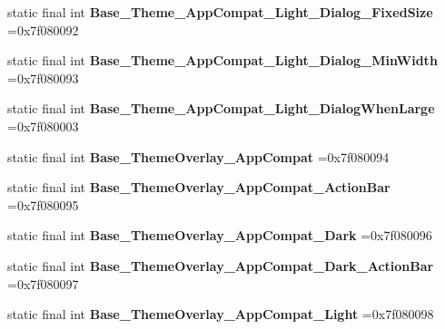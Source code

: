 \begin{DoxyCompactItemize}
\item 
\hypertarget{classcheck_1_1test_1_1_r_1_1style_a38aeff44175280c443f1693713c6e28d}{}static final int {\bfseries Base\+\_\+\+Theme\+\_\+\+App\+Compat\+\_\+\+Light\+\_\+\+Dialog\+\_\+\+Fixed\+Size} =0x7f080092\label{classcheck_1_1test_1_1_r_1_1style_a38aeff44175280c443f1693713c6e28d}

\item 
\hypertarget{classcheck_1_1test_1_1_r_1_1style_a411dd593cb514d32bf70653bcd704ce3}{}static final int {\bfseries Base\+\_\+\+Theme\+\_\+\+App\+Compat\+\_\+\+Light\+\_\+\+Dialog\+\_\+\+Min\+Width} =0x7f080093\label{classcheck_1_1test_1_1_r_1_1style_a411dd593cb514d32bf70653bcd704ce3}

\item 
\hypertarget{classcheck_1_1test_1_1_r_1_1style_aba284938b7549df2875454d58c2b9645}{}static final int {\bfseries Base\+\_\+\+Theme\+\_\+\+App\+Compat\+\_\+\+Light\+\_\+\+Dialog\+When\+Large} =0x7f080003\label{classcheck_1_1test_1_1_r_1_1style_aba284938b7549df2875454d58c2b9645}

\item 
\hypertarget{classcheck_1_1test_1_1_r_1_1style_a6604a7e1c8ba3257cc48d29bcad246a7}{}static final int {\bfseries Base\+\_\+\+Theme\+Overlay\+\_\+\+App\+Compat} =0x7f080094\label{classcheck_1_1test_1_1_r_1_1style_a6604a7e1c8ba3257cc48d29bcad246a7}

\item 
\hypertarget{classcheck_1_1test_1_1_r_1_1style_af0b76cd9892924b923fca855db73afac}{}static final int {\bfseries Base\+\_\+\+Theme\+Overlay\+\_\+\+App\+Compat\+\_\+\+Action\+Bar} =0x7f080095\label{classcheck_1_1test_1_1_r_1_1style_af0b76cd9892924b923fca855db73afac}

\item 
\hypertarget{classcheck_1_1test_1_1_r_1_1style_aa2ac1f9ef87642392fecd431b2fc95f8}{}static final int {\bfseries Base\+\_\+\+Theme\+Overlay\+\_\+\+App\+Compat\+\_\+\+Dark} =0x7f080096\label{classcheck_1_1test_1_1_r_1_1style_aa2ac1f9ef87642392fecd431b2fc95f8}

\item 
\hypertarget{classcheck_1_1test_1_1_r_1_1style_ac05367e2695c24c8659261b5197cd923}{}static final int {\bfseries Base\+\_\+\+Theme\+Overlay\+\_\+\+App\+Compat\+\_\+\+Dark\+\_\+\+Action\+Bar} =0x7f080097\label{classcheck_1_1test_1_1_r_1_1style_ac05367e2695c24c8659261b5197cd923}

\item 
\hypertarget{classcheck_1_1test_1_1_r_1_1style_a06676070f9e2fd361ac1d411876e5e65}{}static final int {\bfseries Base\+\_\+\+Theme\+Overlay\+\_\+\+App\+Compat\+\_\+\+Light} =0x7f080098\label{classcheck_1_1test_1_1_r_1_1style_a06676070f9e2fd361ac1d411876e5e65}


\end{DoxyCompactItemize}
